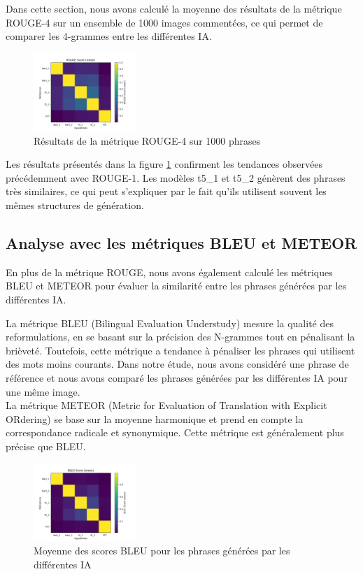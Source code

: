 \documentclass[conference]{IEEEtran}
\begin{document}
Dans cette section, nous avons calculé la moyenne des résultats de la métrique ROUGE-4 sur un ensemble de 1000 images commentées, ce qui permet de comparer les 4-grammes entre les différentes IA.

\begin{figure}[ht!]
\centering
\includegraphics[width=0.35\textwidth]{images/rouge_score_mean_4.png}
\caption{Résultats de la métrique ROUGE-4 sur 1000 phrases}
\label{fig:rouge_score_mean_4}
\end{figure}

Les résultats présentés dans la figure \ref{fig:rouge_score_mean_4} confirment les tendances observées précédemment avec ROUGE-1. Les modèles t5\_1 et t5\_2 génèrent des phrases très similaires, ce qui peut s'expliquer par le fait qu'ils utilisent souvent les mêmes structures de génération.

\subsection{Analyse avec les métriques BLEU et METEOR}

En plus de la métrique ROUGE, nous avons également calculé les métriques BLEU et METEOR pour évaluer la similarité entre les phrases générées par les différentes IA.

La métrique BLEU (Bilingual Evaluation Understudy) mesure la qualité des reformulations, en se basant sur la précision des N-grammes tout en pénalisant la brièveté. Toutefois, cette métrique a tendance à pénaliser les phrases qui utilisent des mots moins courants. Dans notre étude, nous avons considéré une phrase de référence et nous avons comparé les phrases générées par les différentes IA pour une même image.\\

La métrique METEOR (Metric for Evaluation of Translation with Explicit ORdering) se base sur la moyenne harmonique et prend en compte la correspondance radicale et synonymique. Cette métrique est généralement plus précise que BLEU.\\

\begin{figure}[htbp!]
\centering
\includegraphics[width=0.35\textwidth]{images/bleu_score_mean_1000.png}
\caption{Moyenne des scores BLEU pour les phrases générées par les différentes IA}
\label{fig}
\end{figure}
\end{document}
